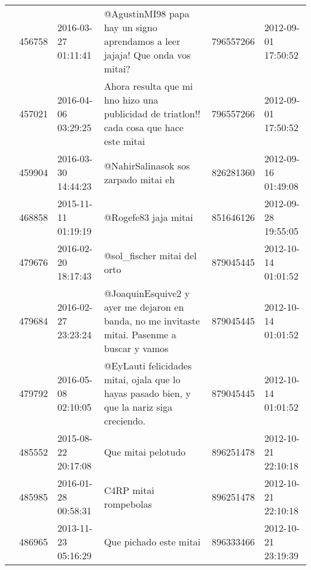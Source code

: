 \begin{tabular}{llllrl}
           & 456758  & 2016-03-27 01:11:41 &                                                                 @AgustinMI98 papa hay un signo aprendamos a leer jajaja! Que onda vos mitai? &   796557266 & 2012-09-01 17:50:52 \\
           & 457021  & 2016-04-06 03:29:25 &                                                     Ahora resulta que mi hno hizo una publicidad de triatlon!! cada cosa que hace este mitai &   796557266 & 2012-09-01 17:50:52 \\
           & 459904  & 2016-03-30 14:44:23 &                                                                                                         @NahirSalinasok sos zarpado mitai eh &   826281360 & 2012-09-16 01:49:08 \\
           & 468858  & 2015-11-11 01:19:19 &                                                                                                                         @Rogefe83 jaja mitai &   851646126 & 2012-09-28 19:55:05 \\
           & 479676  & 2016-02-20 18:17:43 &                                                                                                                  @sol\_fischer mitai del orto &   879045445 & 2012-10-14 01:01:52 \\
           & 479684  & 2016-02-27 23:23:24 &                                                 @JoaquinEsquive2 y ayer me dejaron en banda, no me invitaste mitai. Pasenme a buscar y vamos &   879045445 & 2012-10-14 01:01:52 \\
           & 479792  & 2016-05-08 02:10:05 &                                                   @EyLauti felicidades mitai, ojala que lo hayas pasado bien, y que la nariz siga creciendo. &   879045445 & 2012-10-14 01:01:52 \\
           & 485552  & 2015-08-22 20:17:08 &                                                                                                                           Que mitai pelotudo &   896251478 & 2012-10-21 22:10:18 \\
           & 485985  & 2016-01-28 00:58:31 &                                                                                                                        C4RP mitai rompebolas &   896251478 & 2012-10-21 22:10:18 \\
           & 486965  & 2013-11-23 05:16:29 &                                                                                                                       Que pichado este mitai &   896333466 & 2012-10-21 23:19:39 \\

\end{tabular}
